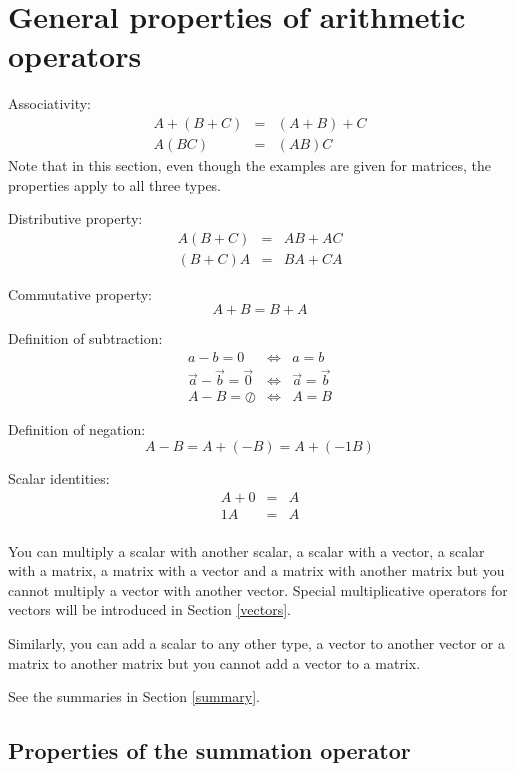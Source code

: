 \documentclass{article}
\newcommand{\zeromatrix}{\oslash}
\begin{document}
\section{General properties of arithmetic operators}

Associativity:
\begin{eqnarray}
	A + (B + C) & = & (A + B) + C \\
	A(BC) & = & (AB)C
\end{eqnarray}
Note that in this section, even though the examples are given for matrices,
the properties apply to all three types.

Distributive property:
\begin{eqnarray}
	A (B + C) & = & A B + A C \\
	(B + C) A & = & B A + C A
\end{eqnarray}

Commutative property:
\begin{equation}
	A + B = B + A
\end{equation}

Definition of subtraction:
\begin{eqnarray}
	a - b = 0 & \iff & a = b \\
	\vec a - \vec b = \vec 0 & \iff & \vec a = \vec b \\
	A - B = \zeromatrix & \iff & A = B
\end{eqnarray}

Definition of negation:
\begin{equation}
	A - B = A + (- B) = A + (-1 B)
\end{equation}

Scalar identities:
\begin{eqnarray}
	A + 0 & = & A \\
	1 A & = & A \\
\end{eqnarray}

You can multiply a scalar with another scalar,
a scalar with a vector, a scalar with a matrix, a 
matrix with a vector and a matrix with another matrix but you cannot
multiply a vector with another vector.
Special multiplicative operators for vectors will be introduced in Section
\ref{vectors}.

Similarly, you can add a scalar to any other type, a vector to another
vector or a matrix to another matrix but you cannot add a vector to
a matrix.

See the summaries in Section \ref{summary}.

\subsection{Properties of the summation operator}
\end{document}
